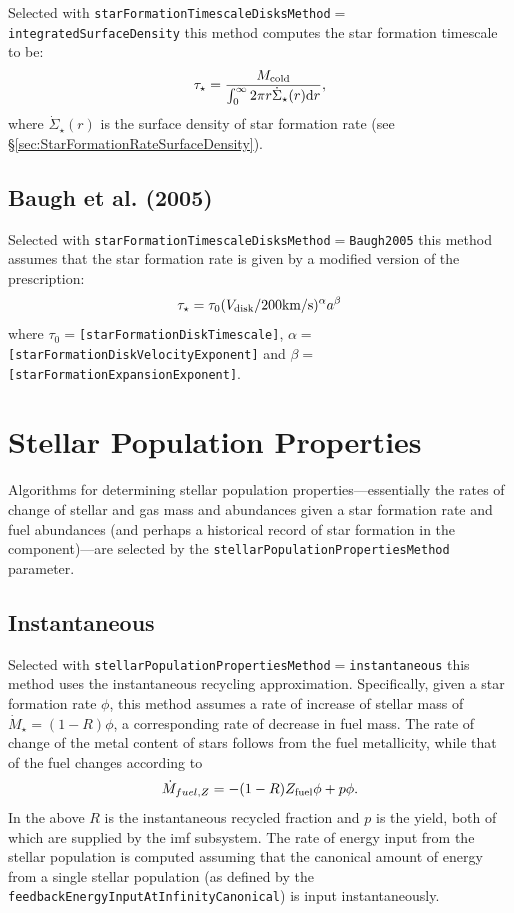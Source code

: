 Selected with {\tt starFormationTimescaleDisksMethod}$=${\tt integratedSurfaceDensity} this method computes the star formation timescale to be:
\begin{equation}
 \tau_\star =  {M_{\rm cold} \over \int_0^\infty 2 \pi r \dot{\Sigma}_\star(r) {\rm d}r},
\end{equation}
where $\dot{\Sigma}_\star(r)$ is the surface density of star formation rate (see \S\ref{sec:StarFormationRateSurfaceDensity}).

\subsection{Baugh et al. (2005)}

Selected with {\tt starFormationTimescaleDisksMethod}$=${\tt Baugh2005} this method assumes that the star formation rate is given by a modified version of the \cite{baugh_can_2005} prescription:
\begin{equation}
\tau_\star = \tau_0 (V_{\rm disk}/200\hbox{km/s})^\alpha a^\beta
\end{equation}
where $\tau_0=${\tt [starFormationDiskTimescale]}, $\alpha=${\tt [starFormationDiskVelocityExponent]} and $\beta=${\tt [starFormationExpansionExponent]}.

\section{Stellar Population Properties}\label{sec:StellarPopulationProperties}

Algorithms for determining stellar population properties---essentially the rates of change of stellar and gas mass and abundances given a star formation rate and fuel abundances (and perhaps a historical record of star formation in the component)---are selected by the {\tt stellarPopulationPropertiesMethod} parameter.

\subsection{Instantaneous}

Selected with {\tt stellarPopulationPropertiesMethod}$=${\tt instantaneous} this method uses the instantaneous recycling approximation. Specifically, given a star formation rate $\phi$, this method assumes a rate of increase of stellar mass of $\dot{M}_\star=(1-R)\phi$, a corresponding rate of decrease in fuel mass. The rate of change of the metal content of stars follows from the fuel metallicity, while that of the fuel changes according to
\begin{equation}
 \dot{M}_{fuel,Z} = - (1-R) Z_{\rm fuel} \phi + p \phi.
\end{equation}
In the above $R$ is the instantaneous recycled fraction and $p$ is the yield, both of which are supplied by the \gls{imf} subsystem. The rate of energy input from the stellar population is computed assuming that the canonical amount of energy from a single stellar population (as defined by the {\tt feedbackEnergyInputAtInfinityCanonical}) is input instantaneously.

